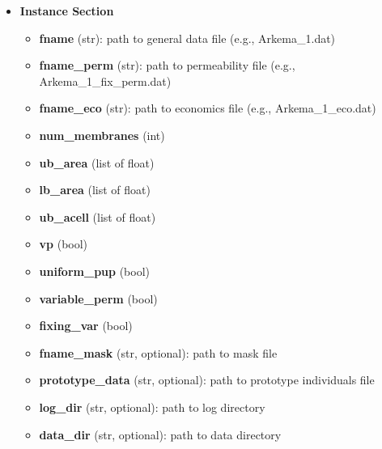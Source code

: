 \documentclass[12pt]{article}
\theoremstyle{definition}
\theoremstyle{definition}
\theoremstyle{remark}
\theoremstyle{remark}
\theoremstyle{definition}
\theoremstyle{remark}
\begin{document}
\begin{itemize}
\begin{itemize}
			\item \textbf{Instance Section}
		\begin{itemize}
\item \textbf{fname }(str): path to general data file (e.g., Arkema\_1.dat)
\item \textbf{fname\_perm }(str): path to permeability file (e.g., Arkema\_1\_fix\_perm.dat)
\item \textbf{fname\_eco }(str): path to economics file (e.g., Arkema\_1\_eco.dat)
\item \textbf{num\_membranes }(int)
\item \textbf{ub\_area }(list of float)
\item \textbf{lb\_area }(list of float)
\item \textbf{ub\_acell }(list of float)
\item \textbf{vp }(bool)
\item \textbf{uniform\_pup }(bool)
\item \textbf{variable\_perm }(bool)
\item \textbf{fixing\_var }(bool)
\item \textbf{fname\_mask }(str, optional): path to mask file
\item \textbf{prototype\_data }(str, optional): path to prototype individuals file
\item \textbf{log\_dir }(str, optional): path to log directory
\item \textbf{data\_dir }(str, optional): path to data directory

			
		\end{itemize}
			
		\end{itemize}
\end{itemize}
\end{document}
